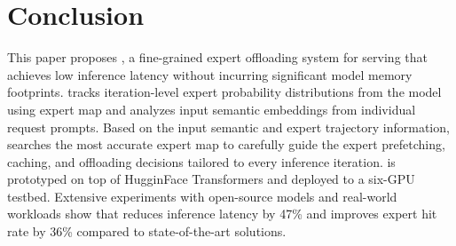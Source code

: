 \section{Conclusion}

This paper proposes \sys, a fine-grained expert offloading system for \MoE serving that achieves low inference latency without incurring significant model memory footprints.
%
\sys tracks iteration-level expert probability distributions from the \MoE model using expert map and analyzes input semantic embeddings from individual request prompts.
%
Based on the input semantic and expert trajectory information, \sys searches the most accurate expert map to carefully guide the expert prefetching, caching, and offloading decisions tailored to every inference iteration.
%
\sys is prototyped on top of HugginFace Transformers and deployed to a six-GPU testbed.
Extensive experiments with open-source \MoE models and real-world workloads show that \sys reduces inference latency by 47\% and improves expert hit rate by 36\% compared to state-of-the-art solutions.